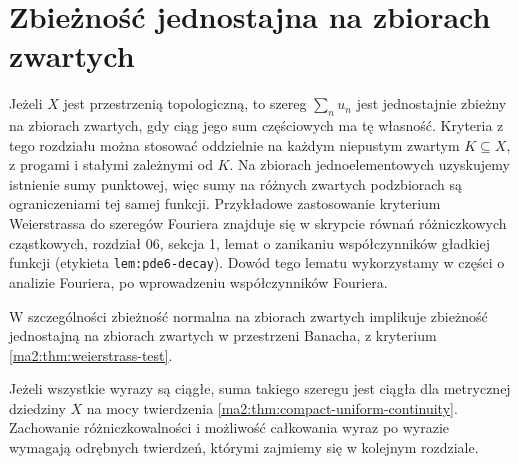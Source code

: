 \section{Zbieżność jednostajna na zbiorach zwartych}

Jeżeli $X$ jest przestrzenią topologiczną, to
szereg $\sum_n u_n$ jest jednostajnie zbieżny
na zbiorach zwartych, gdy ciąg jego sum częściowych
ma tę własność. Kryteria z tego rozdziału można
stosować oddzielnie na każdym niepustym zwartym
$K\subseteq X$, z progami i stałymi zależnymi od $K$.
Na zbiorach jednoelementowych uzyskujemy istnienie
sumy punktowej, więc sumy na różnych zwartych
podzbiorach są ograniczeniami tej samej funkcji.
Przykładowe zastosowanie kryterium Weierstrassa
do szeregów Fouriera znajduje się w skrypcie
równań różniczkowych cząstkowych, rozdział 06,
sekcja 1, lemat o zanikaniu współczynników gładkiej
funkcji (etykieta \texttt{lem:pde6-decay}).
Dowód tego lematu wykorzystamy w części o analizie
Fouriera, po wprowadzeniu współczynników Fouriera.

W szczególności zbieżność normalna na zbiorach
zwartych implikuje zbieżność jednostajną na zbiorach
zwartych w przestrzeni Banacha, z kryterium
\ref{ma2:thm:weierstrass-test}.

Jeżeli wszystkie wyrazy są ciągłe, suma takiego
szeregu jest ciągła dla metrycznej dziedziny
$X$ na mocy twierdzenia
\ref{ma2:thm:compact-uniform-continuity}.
Zachowanie różniczkowalności i możliwość
całkowania wyraz po wyrazie wymagają odrębnych
twierdzeń, którymi zajmiemy się w kolejnym rozdziale.
